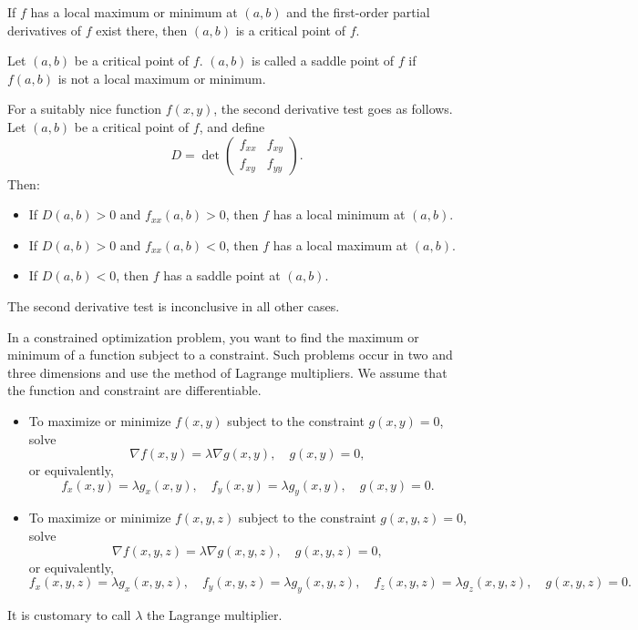 \begin{fact}
	If $f$ has a local maximum or minimum at $(a, b)$ and the first-order partial
	derivatives of $f$ exist there, then $(a, b)$ is a critical point of $f$.
\end{fact}

\begin{definition}
	Let $(a, b)$ be a critical point of $f$. $(a, b)$ is called a saddle point of
	$f$ if $f(a, b)$ is not a local maximum or minimum.
\end{definition}

\begin{fact}
	For a suitably nice function $f(x, y)$, the second derivative test goes as
	follows. Let $(a, b)$ be a critical point of $f$, and define
	\[
		D = \det
		\begin{pmatrix}
			f_{xx} & f_{xy} \\
			f_{xy} & f_{yy}
		\end{pmatrix}.
	\]
	Then:
	\begin{itemize}
		\item If $D(a, b) > 0$ and $f_{xx}(a, b) > 0$, then $f$ has a local minimum
			at $(a, b)$.
		\item If $D(a, b) > 0$ and $f_{xx}(a, b) < 0$, then $f$ has a local maximum
			at $(a, b)$.
		\item If $D(a, b) < 0$, then $f$ has a saddle point at $(a, b)$.
	\end{itemize}
	The second derivative test is inconclusive in all other cases.
\end{fact}

\begin{fact}
	In a constrained optimization problem, you want to find the maximum or minimum
	of a function subject to a constraint. Such problems occur in two and three
	dimensions and use the method of Lagrange multipliers. We assume that the
	function and constraint are differentiable.
	\begin{itemize}
		\item To maximize or minimize $f(x, y)$ subject to the constraint $g(x, y) =
			0$, solve
			\[
				\nabla f(x, y) = \lambda \nabla g(x, y), \quad g(x, y) = 0,
			\]
			or equivalently,
			\[
				f_x(x, y) = \lambda g_x(x, y), \quad f_y(x, y) = \lambda g_y(x, y),
				\quad g(x, y) = 0.
			\]
		\item To maximize or minimize $f(x, y, z)$ subject to the constraint $g(x, y,
			z) = 0$, solve
			\[
				\nabla f(x, y, z) = \lambda \nabla g(x, y, z), \quad g(x, y, z) = 0,
			\]
			or equivalently,
			\[
				f_x(x, y, z) = \lambda g_x(x, y, z), \quad f_y(x, y, z) = \lambda g_y(x,
				y, z), \quad f_z(x, y, z) = \lambda g_z(x, y, z), \quad g(x, y, z) = 0.
			\]
	\end{itemize}
	It is customary to call $\lambda$ the Lagrange multiplier.
\end{fact}


